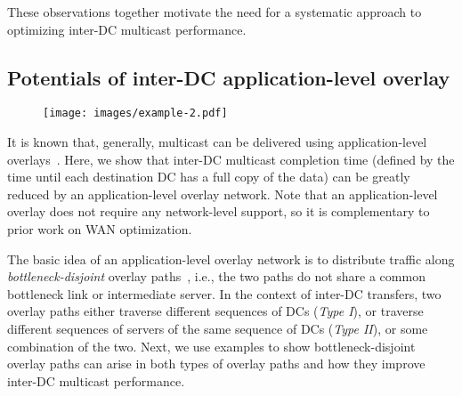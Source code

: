 \vspace{0.1cm}
These observations together motivate the need for a systematic approach
to optimizing inter-DC multicast performance.

\subsection{Potentials of inter-DC application-level overlay}
\label{subsec:motivation:case-for}

\begin{figure}[t]
\centering
\texttt{[image: images/example-2.pdf]}
\label{fig:case:example}
\end{figure}

It is known that, generally, multicast can be delivered using application-level
overlays~\cite{chu2000case}. Here, we show that inter-DC multicast
completion time (defined by the time until each destination DC has
a full copy of the data) can be greatly reduced by an
application-level overlay network. Note that an application-level
overlay does not require any network-level support, so it is
complementary to prior work on WAN optimization.

The basic idea of an application-level overlay network is to
distribute traffic along {\em bottleneck-disjoint} overlay
paths~\cite{datta19951}, i.e., the two paths do not share a common
bottleneck link or intermediate server.
In the context of inter-DC transfers, two overlay paths either
traverse different sequences of DCs ({\em Type I}), or
traverse different sequences of servers of the same sequence of
DCs ({\em Type II}), or some combination of the two.
Next, we use examples to show bottleneck-disjoint overlay paths can
arise in both types of overlay paths and how they improve inter-DC
multicast performance.

